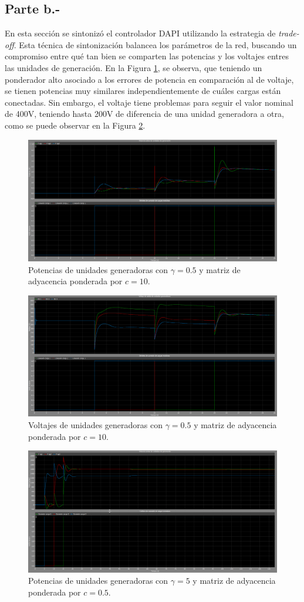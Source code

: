 \subsection{Parte b.-}

En esta sección se sintonizó el controlador DAPI utilizando la estrategia de \textit{trade-off}. Esta técnica de sintonización balancea los parámetros de la red, buscando un compromiso entre qué tan bien se comparten las potencias y los voltajes entres las unidades de generación. En la Figura \ref{potencia-compartida}, se observa, que teniendo un ponderador alto asociado a los errores de potencia en comparación al de voltaje, se tienen potencias muy similares independientemente de cuáles cargas están conectadas. Sin embargo, el voltaje tiene problemas para seguir el valor nominal de 400V, teniendo hasta 200V de diferencia de una unidad generadora a otra, como se puede observar en la Figura \ref{voltaje-malo}.
 
\begin{figure}
    \centering
    \includegraphics[width=0.5\linewidth]{Tarea 2/report/imagenes/p2b/potencia-compartida.png}
    \caption{Potencias de unidades generadoras con $\gamma = 0.5$ y matriz de adyacencia ponderada por $c = 10$.}
    \label{potencia-compartida}
\end{figure}

\begin{figure}
    \centering
    \includegraphics[width=0.5\linewidth]{Tarea 2/report/imagenes/p2b/voltaje-malo.png}
    \caption{Voltajes de unidades generadoras con $\gamma = 0.5$ y matriz de adyacencia ponderada por $c = 10$.}
    \label{voltaje-malo}
\end{figure}

\begin{figure}
    \centering
    \includegraphics[width=0.5\linewidth]{Tarea 2/report/imagenes/p2b/potencia-mala.png}
    \caption{Potencias de unidades generadoras con $\gamma = 5$ y matriz de adyacencia ponderada por $c = 0.5$.}
    \label{potencia-mala}
\end{figure}

